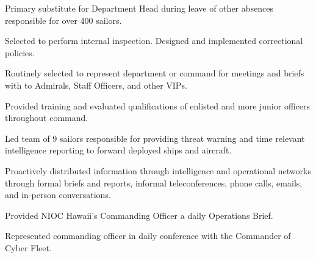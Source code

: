 \begin{tightemize}
\item Primary substitute for Department Head during leave of other absences responsible for over 400 sailors.
\item Selected to perform internal inspection. Designed and implemented correctional policies.
\item Routinely selected to represent department or command for meetings and briefs with to Admirals, Staff Officers, and other VIPs.
\item Provided training and evaluated qualifications of enlisted and more junior officers throughout command.
\end{tightemize}
\sectionsep

\begin{tightemize}
\item Led team of 9 sailors responsible for providing threat warning and time relevant intelligence reporting to forward deployed ships and aircraft.
\item Proactively distributed information through intelligence and operational networks through formal briefs and reports, informal teleconferences, phone calls, emails, and in-person conversations.
\item Provided NIOC Hawaii's Commanding Officer a daily Operations Brief.
\item Represented commanding officer in daily conference with the Commander of Cyber Fleet.
\end{tightemize}
\sectionsep

\sectionsep

